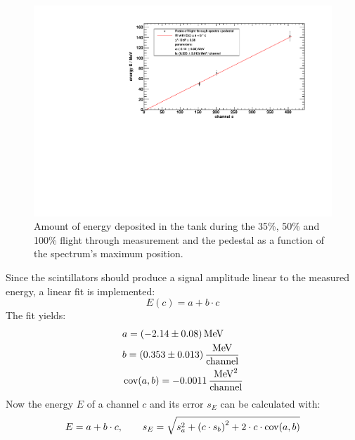 \begin{figure}[H]
\begin{center}
  \includegraphics[width=\textwidth]{../img/energyCalibration.pdf}
  \caption{Amount of energy deposited in the tank during the 35\%, 50\% and 100\% flight through measurement and the pedestal as a function of the 
  spectrum's maximum position.}
  \label{img:energycalibration}
\end{center}
\end{figure}
Since the scintillators should produce a signal amplitude linear to the measured energy, a linear fit is implemented:
\begin{equation}
    E(c) = a + b \cdot c
\end{equation}
The fit yields:
\begin{equation}
    \begin{split}
        & a = (-2.14 \pm 0.08) \, \text{MeV} \\
        & b = (0.353 \pm 0.013) \, \frac{\text{MeV}}{\text{channel}} \\
        & \operatorname{cov}(a, b) = -0.0011 \, \frac{\text{MeV}^2}{\text{channel}} 
    \end{split}
\end{equation}
Now the energy $E$ of a channel $c$ and its error $s_E$ can be calculated with:
\begin{equation}
\label{eq:ecalibration}
    E = a + b \cdot c, \qquad s_E = \sqrt{s_a^2 + \left(c \cdot s_b \right)^2 + 2 \cdot c \cdot \operatorname{cov}(a,b)}
\end{equation}

